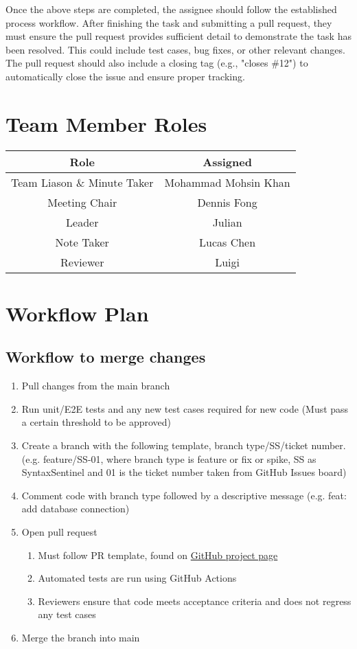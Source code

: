 \documentclass{article}
\begin{document}
Once the above steps are completed, the assignee should follow the established 
process workflow. After finishing the task and submitting a pull request, they 
must ensure the pull request provides sufficient detail to demonstrate the task 
has been resolved. This could include test cases, bug fixes, or other relevant 
changes. The pull request should also include a closing tag (e.g., "closes \#12") 
to automatically close the issue and ensure proper tracking.

\section{Team Member Roles}

\begin{tabular}{|c|c|}
\hline
\textbf{Role} & \textbf{Assigned} \\
\hline
Team Liason \& Minute Taker & Mohammad Mohsin Khan \\
\hline
Meeting Chair & Dennis Fong \\
\hline
Leader & Julian \\
\hline
Note Taker & Lucas Chen \\
\hline
Reviewer & Luigi \\
\hline
\end{tabular}

\section{Workflow Plan}

\subsection{Workflow to merge changes}
\begin{enumerate}
    \item Pull changes from the main branch
    \item Run unit/E2E tests and any new test cases required for new code (Must pass a certain threshold to be approved)
    \item Create a branch with the following template, branch type/SS/ticket number. (e.g. feature/SS-01, where branch type is feature or fix or spike, SS as SyntaxSentinel and 01 is the ticket number taken from GitHub Issues board)
    \item Comment code with branch type followed by a descriptive message (e.g. feat: add database connection)
    \item Open pull request
        \begin{enumerate}
            \item Must follow PR template, found on \href{https://github.com/lilweege/SyntaxSentinels/blob/main/.github/pull_request_template.md}{GitHub project page}
            \item Automated tests are run using GitHub Actions
            \item Reviewers ensure that code meets acceptance criteria and does not regress any test cases
        \end{enumerate}
    \item Merge the branch into main
\end{enumerate}
\end{document}
